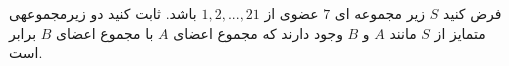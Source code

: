 \exercise
فرض کنيد 
$S$
 زير مجموعه ای 
$7$
  عضوی از 
${1, 2, ..., 21}$
  باشد. ثابت کنيد دو زيرمجموعهی متمايز از 
$S$
مانند 
$A$
 و 
$B$
  وجود دارند که مجموع اعضای 
$A$
   با مجموع اعضای 
$B$
    برابر است.